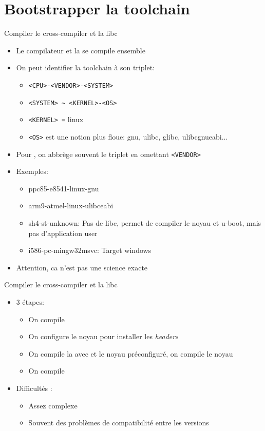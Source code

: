 \section{Bootstrapper la toolchain}

\begin{frame}[fragile=singleslide]{Compiler le cross-compiler et la libc}
  \begin{itemize}
  \item Le compilateur et la  se compile ensemble
  \item On peut identifier la toolchain à son triplet:
    \begin{itemize}
    \item \verb+<CPU>-<VENDOR>-<SYSTEM>+
    \item \verb+<SYSTEM> ~ <KERNEL>-<OS>+
    \item \verb+<KERNEL> =+ linux
    \item \verb+<OS>+  est une notion  plus floue: gnu,  ulibc, glibc,
      ulibcgnueabi...
    \end{itemize}
  \item  Pour ,  on abbrège  souvent le  triplet  en omettant
    \verb+<VENDOR>+
  \item Exemples: 
    \begin{itemize}
    \item ppc85-e8541-linux-gnu %
    \item arm9-atmel-linux-ulibceabi %
    \item sh4-st-unknown: Pas de libc, permet de compiler le noyau
      et u-boot, mais pas d'application user
    \item i586-pc-mingw32msvc: Target windows
    \end{itemize}
  \item Attention, ca n'est pas une science exacte
  \end{itemize}
\end{frame}

\begin{frame}[fragile=singleslide]{Compiler le cross-compiler et la libc}
  \begin{itemize}
  \item 3 étapes: 
    \begin{itemize}
    \item On compile 
    \item On configure le noyau pour installer les \emph{headers}
    \item On  compile la   avec   et le
      noyau préconfiguré, on compile le noyau
    \item On compile 
    \end{itemize}
  \item Difficultés :
    \begin{itemize}
    \item Assez complexe
    \item Souvent des problèmes de compatibilité entre les versions
    \end{itemize}
  \end{itemize}
\end{frame}    

